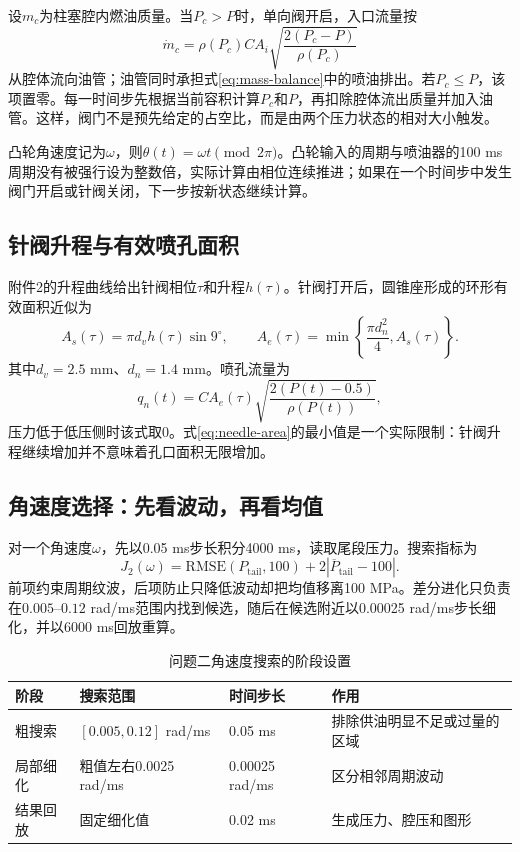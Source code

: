 \documentclass[UTF8,11pt,a4paper]{ctexart}
\newcommand{\abs}[1]{\left\lvert#1\right\rvert}
\begin{document}
设$m_c$为柱塞腔内燃油质量。当$P_c>P$时，单向阀开启，入口流量按
\begin{equation}
\dot m_c=\rho(P_c) C A_i\sqrt{\frac{2(P_c-P)}{\rho(P_c)}}
\end{equation}
从腔体流向油管；油管同时承担式\eqref{eq:mass-balance}中的喷油排出。若$P_c\leq P$，该项置零。每一时间步先根据当前容积计算$P_c$和$P$，再扣除腔体流出质量并加入油管。这样，阀门不是预先给定的占空比，而是由两个压力状态的相对大小触发。

凸轮角速度记为$\omega$，则$\theta(t)=\omega t\pmod {2\pi}$。凸轮输入的周期与喷油器的100 ms周期没有被强行设为整数倍，实际计算由相位连续推进；如果在一个时间步中发生阀门开启或针阀关闭，下一步按新状态继续计算。

\subsection{针阀升程与有效喷孔面积}

附件2的升程曲线给出针阀相位$\tau$和升程$h(\tau)$。针阀打开后，圆锥座形成的环形有效面积近似为
\begin{equation}
A_s(\tau)=\pi d_v h(\tau)\sin 9^{\circ},\qquad
A_e(\tau)=\min\left\{\frac{\pi d_n^2}{4},A_s(\tau)\right\}.
\label{eq:needle-area}
\end{equation}
其中$d_v=2.5$ mm、$d_n=1.4$ mm。喷孔流量为
\begin{equation}
q_n(t)=C A_e(\tau)\sqrt{\frac{2(P(t)-0.5)}{\rho(P(t))}},
\label{eq:nozzle-flow}
\end{equation}
压力低于低压侧时该式取0。式\eqref{eq:needle-area}的最小值是一个实际限制：针阀升程继续增加并不意味着孔口面积无限增加。

\subsection{角速度选择：先看波动，再看均值}

对一个角速度$\omega$，先以0.05 ms步长积分4000 ms，读取尾段压力。搜索指标为
\begin{equation}
J_2(\omega)=\mathrm{RMSE}(P_{\mathrm{tail}},100)+2\abs{\overline P_{\mathrm{tail}}-100}.
\end{equation}
前项约束周期纹波，后项防止只降低波动却把均值移离100 MPa。差分进化只负责在$0.005$--$0.12$ rad/ms范围内找到候选，随后在候选附近以0.00025 rad/ms步长细化，并以6000 ms回放重算。

\begin{table}[H]
\centering
\caption{问题二角速度搜索的阶段设置}
\label{tab:q2-search}
\small
\begin{tabularx}{\textwidth}{p{3.4cm}p{3.1cm}p{3.5cm}X}
\toprule
阶段 & 搜索范围 & 时间步长 & 作用\\
\midrule
粗搜索 & $[0.005,0.12]$ rad/ms & 0.05 ms & 排除供油明显不足或过量的区域\\
局部细化 & 粗值左右0.0025 rad/ms & 0.00025 rad/ms & 区分相邻周期波动\\
结果回放 & 固定细化值 & 0.02 ms & 生成压力、腔压和图形\\
\bottomrule
\end{tabularx}
\end{table}
\end{document}
